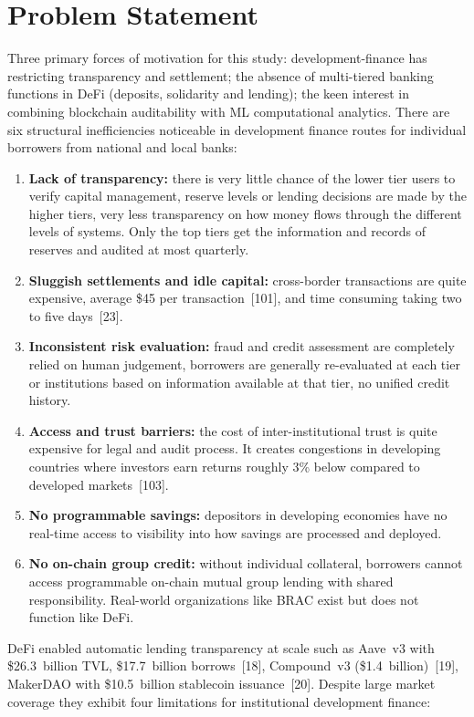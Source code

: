\documentclass[12pt,a4paper]{report}
\begin{document}
\section{Problem Statement}

Three primary forces of motivation for this study: development-finance has restricting transparency and settlement; the absence of multi-tiered banking functions in DeFi (deposits, solidarity and lending); the keen interest in combining blockchain auditability with ML computational analytics. There are six structural inefficiencies noticeable in development finance routes for individual borrowers from national and local banks:

\begin{enumerate}[noitemsep]
\item \textbf{Lack of transparency:} there is very little chance of the lower tier users to verify capital management, reserve levels or lending decisions are made by the higher tiers, very less transparency on how money flows through the different levels of systems. Only the top tiers get the information and records of reserves and audited at most quarterly.
\item \textbf{Sluggish settlements and idle capital:} cross-border transactions are quite expensive, average \$45 per transaction~[101], and time consuming taking two to five days~[23].
\item \textbf{Inconsistent risk evaluation:} fraud and credit assessment are completely relied on human judgement, borrowers are generally re-evaluated at each tier or institutions based on information available at that tier, no unified credit history.
\item \textbf{Access and trust barriers:} the cost of inter-institutional trust is quite expensive for legal and audit process. It creates congestions in developing countries where investors earn returns roughly 3\% below compared to developed markets~[103].
\item \textbf{No programmable savings:} depositors in developing economies have no real-time access to visibility into how savings are processed and deployed.
\item \textbf{No on-chain group credit:} without individual collateral, borrowers cannot access programmable on-chain mutual group lending with shared responsibility. Real-world organizations like BRAC exist but does not function like DeFi.
\end{enumerate}

DeFi enabled automatic lending transparency at scale such as Aave~v3 with \$26.3~billion TVL, \$17.7~billion borrows~[18], Compound~v3 (\$1.4~billion)~[19], MakerDAO with \$10.5~billion stablecoin issuance~[20]. Despite large market coverage they exhibit four limitations for institutional development finance:
\end{document}
